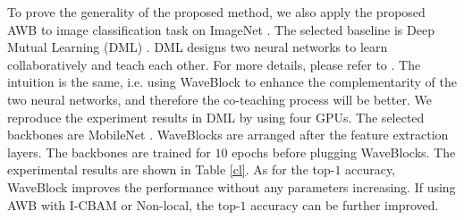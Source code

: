 \documentclass[journal]{IEEEtran}
\begin{document}
To prove the generality of the proposed method, we also apply the proposed AWB to image classification task on ImageNet \cite{deng2009imagenet}. The selected baseline is Deep Mutual Learning (DML) \cite{zhang2018deep}. DML \cite{zhang2018deep} designs two neural networks to learn collaboratively and teach each other. For more details, please refer to \cite{zhang2018deep}. The intuition is the same, i.e. using WaveBlock to enhance the complementarity of the two neural networks, and therefore the co-teaching process will be better. We reproduce the experiment results in DML  \cite{zhang2018deep} by using four GPUs. The selected backbones are MobileNet \cite{howard2017mobilenets}. WaveBlocks are arranged after the feature extraction layers. The backbones are trained for $10$ epochs before plugging WaveBlocks. The experimental results are shown in Table \ref{cl}. As for the top-$1$ accuracy, WaveBlock improves the performance without any parameters increasing. If using AWB with I-CBAM or Non-local, the top-$1$ accuracy can be further improved.
\end{document}
